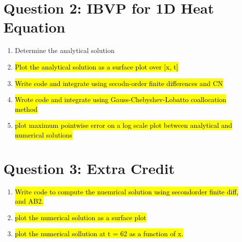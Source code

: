 \documentclass{article}
\begin{document}
\section*{Question 2: IBVP for 1D Heat Equation}

\begin{enumerate}[label=\alph*)]

    \item Determine the analytical solution 

    \item \hl{Plot the analytical solution as a surface plot over [x, t]}

    \item \hl{Write code and integrate using secodn-order finite differences and CN}

    \item \hl{Wrote code and integrate using Gauss-Chebyshev-Lobatto coallocation
    method}

    \item \hl{plot maximum pointwise error on a log scale plot between analytical
    and numerical solutions}

\end{enumerate}

\section*{Question 3: Extra Credit}

\begin{enumerate}[label=\alph*)]

    \item \hl{Write code to compute the nuemrical solution using secondorder finite
    diff, and AB2.} 

    \item \hl{plot the numerical solution as a surface plot}

    \item \hl{plot the numerical sollution at t = 62 as a function of x.}

\end{enumerate}
\end{document}
